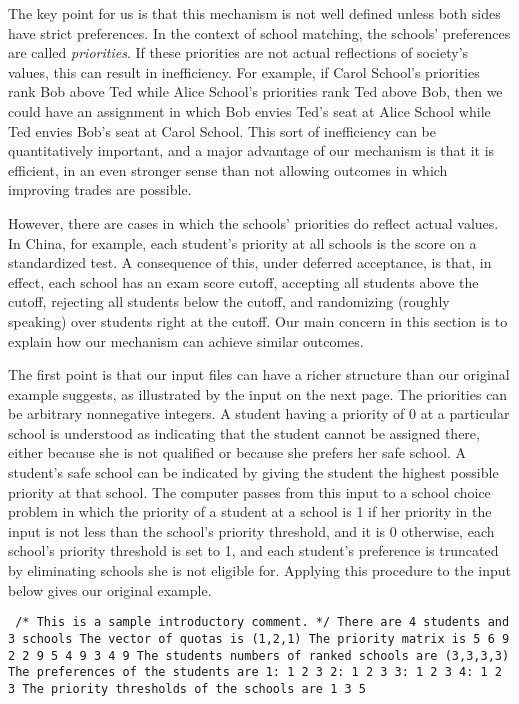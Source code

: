 \documentclass[12pt]{article}
\theoremstyle{definition}
\begin{document}
The key point for us is that this mechanism is not well defined unless
both sides have strict preferences.  In the context of school
matching, the schools' preferences are called \emph{priorities}.  If
these priorities are not actual reflections of society's values, this
can result in inefficiency.  For example, if Carol School's priorities
rank Bob above Ted while Alice School's priorities rank Ted above Bob,
then we could have an assignment in which Bob envies Ted's seat at
Alice School while Ted envies Bob's seat at Carol School.  This sort
of inefficiency can be quantitatively important, and a major advantage
of our mechanism is that it is efficient, in an even stronger sense
than not allowing outcomes in which improving trades are possible.

However, there are cases in which the schools' priorities do reflect
actual values.  In China, for example, each student's priority at all
schools is the score on a standardized test.  A consequence of this,
under deferred acceptance, is that, in effect, each school has an exam
score cutoff, accepting all students above the cutoff, rejecting all
students below the cutoff, and randomizing (roughly speaking) over
students right at the cutoff.  Our main concern in this section is to
explain how our mechanism can achieve similar outcomes.

The first point is that our input files can have a richer structure
than our original example suggests, as illustrated by the input on the
next page.  The priorities can be arbitrary nonnegative integers.  A
student having a priority of 0 at a particular school is understood as
indicating that the student cannot be assigned there, either because
she is not qualified or because she prefers her safe school.  A
student's safe school can be indicated by giving the student the
highest possible priority at that school.  The computer passes from
this input to a school choice problem in which the priority of a
student at a school is 1 if her priority in the input is not less than
the school's priority threshold, and it is 0 otherwise, each school's
priority threshold is set to 1, and each student's preference is
truncated by eliminating schools she is not eligible for.  Applying
this procedure to the input below gives our original example.

\begin{obeylines}\texttt{
/* This is a sample introductory comment. */
There are 4 students and 3 schools
The vector of quotas is (1,2,1)
The priority matrix is
     5     6     9
     2     2     9
     5     4     9
     3     4     9
The students numbers of ranked schools are (3,3,3,3)
The preferences of the students are
1:  1  2  3  
2:  1  2  3  
3:  1  2  3  
4:  1  2  3  
The priority thresholds of the schools are
1   3   5   
  }
\end{obeylines}
\end{document}

